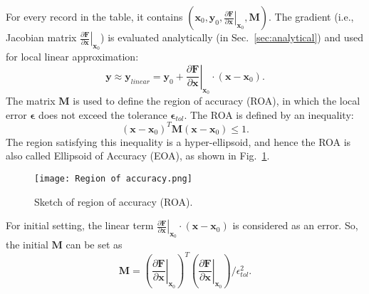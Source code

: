 For every record in the table, it contains $(\mathbf{x}_0,\mathbf{y}_0,\left.\frac{\partial  \mathbf{F}}{\partial \mathbf{x}}\right|_{\mathbf{x}_0}, \mathbf{M})$. 
The gradient (i.e., Jacobian matrix $\left.\frac{\partial  \mathbf{F}}{\partial \mathbf{x}}\right|_{\mathbf{x}_0}$) is evaluated analytically (in Sec.~\ref{sec:analytical}) and used for local linear approximation:
$$\mathbf{y}\approx\mathbf{y}_{linear}=\mathbf{y}_0+\left.\frac{\partial  \mathbf{F}}{\partial \mathbf{x}}\right|_{\mathbf{x}_0}\cdot\left(\mathbf{x}-\mathbf{x}_0\right).$$
The matrix $\mathbf{M}$ is used to define the region of accuracy (ROA), in which the local error
$\mathbf{\epsilon}$ does not exceed the tolerance $\mathbf{\epsilon}_{tol}$. The ROA is defined by an inequality:
$$\left(\mathbf{x}-\mathbf{x}_0\right)^T \mathbf{M} \left(\mathbf{x}-\mathbf{x}_0\right) \leq 1.$$
The region satisfying this inequality is a hyper-ellipsoid, and hence the ROA is also called Ellipsoid of Accuracy (EOA), as shown in Fig.~\ref{ISAT_ROA}.
\begin{figure}[htbp]
    \centering
\texttt{[image: Region of accuracy.png]} 
\caption{Sketch of region of accuracy (ROA).}
\label{ISAT_ROA} 
\end{figure}
For initial setting, the linear term $\left.\frac{\partial  \mathbf{F}}{\partial \mathbf{x}}\right|_{\mathbf{x}_0}\cdot\left(\mathbf{x}-\mathbf{x}_0\right)$ is considered as an error. So, the initial $\mathbf{M}$ can be set as 
$$\mathbf{M}=\left(\left.\frac{\partial  \mathbf{F}}{\partial \mathbf{x}}\right|_{\mathbf{x}_0}\right)^T \left(\left.\frac{\partial  \mathbf{F}}{\partial \mathbf{x}}\right|_{\mathbf{x}_0}\right)/\epsilon_{tol}^2.$$


